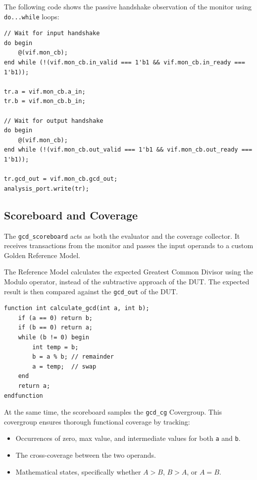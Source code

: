 The following code shows the passive handshake observation of the monitor using \texttt{do...while} loops:

\begin{verbatim}
// Wait for input handshake
do begin
    @(vif.mon_cb);
end while (!(vif.mon_cb.in_valid === 1'b1 && vif.mon_cb.in_ready === 1'b1));

tr.a = vif.mon_cb.a_in;
tr.b = vif.mon_cb.b_in;

// Wait for output handshake
do begin
    @(vif.mon_cb);
end while (!(vif.mon_cb.out_valid === 1'b1 && vif.mon_cb.out_ready === 1'b1));

tr.gcd_out = vif.mon_cb.gcd_out;
analysis_port.write(tr);
\end{verbatim}

\subsection{Scoreboard and Coverage}
The \texttt{gcd\_scoreboard} acts as both the evaluator and the coverage collector. It receives transactions from the monitor and passes the input operands to a custom Golden Reference Model. 

The Reference Model calculates the expected Greatest Common Divisor using the Modulo operator, instead of the subtractive approach of the DUT. The expected result is then compared against the \texttt{gcd\_out} of the DUT.

\begin{verbatim}
function int calculate_gcd(int a, int b);
    if (a == 0) return b;
    if (b == 0) return a;
    while (b != 0) begin
        int temp = b;
        b = a % b; // remainder
        a = temp;  // swap
    end
    return a;
endfunction
\end{verbatim}

At the same time, the scoreboard samples the \texttt{gcd\_cg} Covergroup. This covergroup ensures thorough functional coverage by tracking:
\begin{itemize}
    \item Occurrences of zero, max value, and intermediate values for both \texttt{a} and \texttt{b}.
    \item The cross-coverage between the two operands.
    \item Mathematical states, specifically whether $A > B$, $B > A$, or $A = B$.
\end{itemize}

